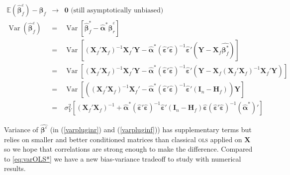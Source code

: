 \documentclass[12pt,a4paper]{report}
\begin{document}
	\begin{eqnarray}
		\mathbb{E}(\hat{\boldsymbol{\beta}}_f^{\varepsilon})-\boldsymbol{\beta}_f&\longrightarrow & \boldsymbol{0} \textrm{ (still asymptotically unbiased)}\\
		\operatorname{Var}(\hat{\boldsymbol{\beta}}_f^{\varepsilon})&=&\operatorname{Var}[\hat{\boldsymbol{\beta}}^*_f-\hat{\boldsymbol{\alpha}}^*\hat{\boldsymbol{\beta}}_{r}^{\varepsilon}] \nonumber \\
		&=&\operatorname{Var}[(\boldsymbol{X}_f'\boldsymbol{X}_f)^{-1}\boldsymbol{X}_f'\boldsymbol{Y}-\hat{\boldsymbol{\alpha}}^*(\hat{\boldsymbol{\varepsilon}}'\hat{\boldsymbol{\varepsilon}})^{-1}\hat{\boldsymbol{\varepsilon}}'(\boldsymbol{Y}- \boldsymbol{X}_f\hat{\boldsymbol{\beta}^*_f})]  \nonumber \\
		&=&\operatorname{Var}[(\boldsymbol{X}_f'\boldsymbol{X}_f)^{-1}\boldsymbol{X}_f'\boldsymbol{Y}-\hat{\boldsymbol{\alpha}}^*(\hat{\boldsymbol{\varepsilon}}'\hat{\boldsymbol{\varepsilon}})^{-1}\hat{\boldsymbol{\varepsilon}}'(\boldsymbol{Y}- \boldsymbol{X}_f(\boldsymbol{X}_f'\boldsymbol{X}_f)^{-1}\boldsymbol{X}_f'\boldsymbol{Y})]  \nonumber \\
		&=&\operatorname{Var}\left[\left((\boldsymbol{X}_f'\boldsymbol{X}_f)^{-1}\boldsymbol{X}_f'-\hat{\boldsymbol{\alpha}}^*(\hat{\boldsymbol{\varepsilon}}'\hat{\boldsymbol{\varepsilon}})^{-1}\hat{\boldsymbol{\varepsilon}}'(\boldsymbol{I}_n-\boldsymbol{H}_f)\right)\boldsymbol{Y}\right]  \nonumber \\
		&=&\sigma_Y^2[(\boldsymbol{X}_f'\boldsymbol{X}_f)^{-1}+\hat{\boldsymbol{\alpha}}^*(\hat{\boldsymbol{\varepsilon}}'\hat{\boldsymbol{\varepsilon}})^{-1}\hat{\boldsymbol{\varepsilon}}'(\boldsymbol{I}_n-\boldsymbol{H}_f)\hat{\boldsymbol{\varepsilon}}(\hat{\boldsymbol{\varepsilon}}'\hat{\boldsymbol{\varepsilon}})^{-1}(\hat{\boldsymbol{\alpha}}^*)'] \label{varpluginf}
	\end{eqnarray}

Variance of $\hat{\boldsymbol{\beta}^{\varepsilon}}$ (in (\ref{varpluginr}) and (\ref{varpluginf})) has supplementary terms but relies on smaller and better conditioned matrices than classical \textsc{ols} applied on $\boldsymbol{X}$ so we hope that correlations are strong enough to make the difference.	Compared to \ref{eq:varOLS*} we have a new bias-variance tradeoff to study with numerical results.\\
	
		
	
\end{document}
